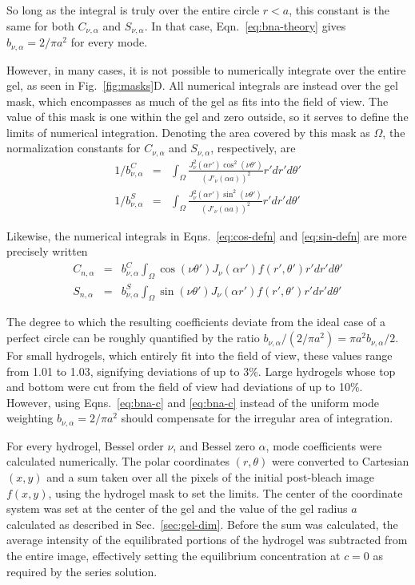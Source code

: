 So long as the integral is truly over the entire circle $r<a$, this constant is the same for both $C_{\nu,\alpha}$ and $S_{\nu,\alpha}$.  In that case, Eqn.~\ref{eq:bna-theory} gives $b_{\nu,\alpha} = 2/\pi a^2$ for every mode.

However, in many cases, it is not possible to numerically integrate over the entire gel, as seen in Fig.~\ref{fig:masks}D.  All numerical integrals are instead over the gel mask, which encompasses as much of the gel as fits into the field of view.  The value of this mask is one within the gel and zero outside, so it serves to define the limits of numerical integration.  Denoting the area covered by this mask as $\Omega$, the normalization constants for $C_{\nu,\alpha}$ and $S_{\nu,\alpha}$, respectively, are
\begin{eqnarray}
1/b_{\nu,\alpha}^C  &= & \int_\Omega \frac{ J_\nu^2(\alpha r')\cos^2(\nu\theta') }{\left(J'_\nu (\alpha a)\right)^2} r' dr' d\theta' \label{eq:bna-c} \\
1/b_{\nu,\alpha}^S  &=  &\int_\Omega \frac{ J_\nu^2(\alpha r')\sin^2(\nu\theta') }{\left(J'_\nu (\alpha a)\right)^2} r' dr' d\theta' \label{eq:bna-s}
\end{eqnarray}

Likewise, the numerical integrals in Eqns.~\ref{eq:cos-defn} and \ref{eq:sin-defn} are more precisely written 
\begin{eqnarray}
C_{n,\alpha} & = &b_{\nu,\alpha}^C \int_\Omega \cos\left(\nu\theta'\right) J_\nu(\alpha r')f(r',\theta') r' dr' d\theta' \label{eq:cos-defn2}\\
S_{n,\alpha} & = & b_{\nu,\alpha}^S\int_\Omega \sin\left(\nu\theta'\right) J_\nu(\alpha r') f(r',\theta') r' dr' d\theta' \label{eq:sin-defn2}
\end{eqnarray}

The degree to which the resulting coefficients deviate from the ideal case of a perfect circle can be roughly quantified by the ratio $b_{\nu,\alpha} /(2/\pi a^2) = \pi a^2 b_{\nu,\alpha} /2$. For small hydrogels, which entirely fit into the field of view, these values range from 1.01 to 1.03, signifying deviations of up to 3\%.  Large hydrogels whose top and bottom were cut from the field of view had deviations of up to 10\%.  However, using Eqns.~\ref{eq:bna-c} and \ref{eq:bna-c} instead of the uniform mode weighting $b_{\nu,\alpha} = 2/\pi a^2$ should compensate for the irregular area of integration.

For every hydrogel, Bessel order $\nu$, and Bessel zero $\alpha$, mode coefficients were calculated numerically.  The polar coordinates $(r,\theta)$ were converted to Cartesian $(x,y)$ and a sum taken over all the pixels of the initial post-bleach image $f(x,y)$, using the hydrogel mask to set the limits.  The center of the coordinate system was set at the center of the gel and the value of the gel radius $a$ calculated as described in Sec.~\ref{sec:gel-dim}. Before the sum was calculated, the average intensity of the equilibrated portions of the hydrogel was subtracted from the entire image, effectively setting the equilibrium concentration at $c=0$ as required by the series solution.

